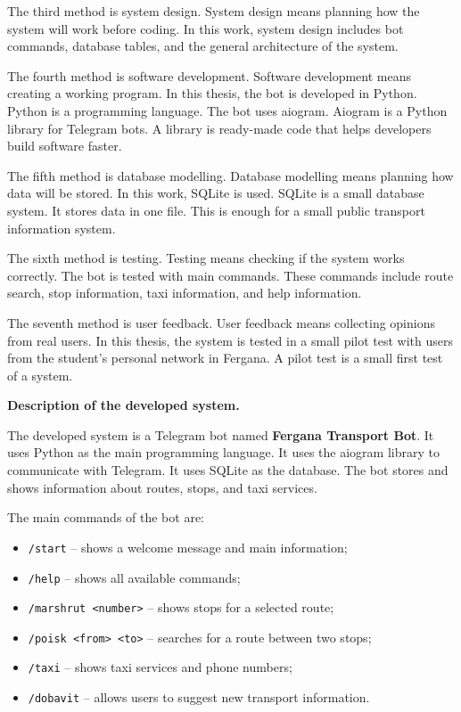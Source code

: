 The third method is system design. System design means planning how the system will work before coding. In this work, system design includes bot commands, database tables, and the general architecture of the system.

The fourth method is software development. Software development means creating a working program. In this thesis, the bot is developed in Python. Python is a programming language. The bot uses aiogram. Aiogram is a Python library for Telegram bots. A library is ready-made code that helps developers build software faster.

The fifth method is database modelling. Database modelling means planning how data will be stored. In this work, SQLite is used. SQLite is a small database system. It stores data in one file. This is enough for a small public transport information system.

The sixth method is testing. Testing means checking if the system works correctly. The bot is tested with main commands. These commands include route search, stop information, taxi information, and help information.

The seventh method is user feedback. User feedback means collecting opinions from real users. In this thesis, the system is tested in a small pilot test with users from the student's personal network in Fergana. A pilot test is a small first test of a system.

\textbf{Description of the developed system.}

The developed system is a Telegram bot named \textbf{Fergana Transport Bot}. It uses Python as the main programming language. It uses the aiogram library to communicate with Telegram. It uses SQLite as the database. The bot stores and shows information about routes, stops, and taxi services.

The main commands of the bot are:

\begin{itemize}
    \item \texttt{/start} -- shows a welcome message and main information;
    \item \texttt{/help} -- shows all available commands;
    \item \texttt{/marshrut <number>} -- shows stops for a selected route;
    \item \texttt{/poisk <from> <to>} -- searches for a route between two stops;
    \item \texttt{/taxi} -- shows taxi services and phone numbers;
    \item \texttt{/dobavit} -- allows users to suggest new transport information.
\end{itemize}

